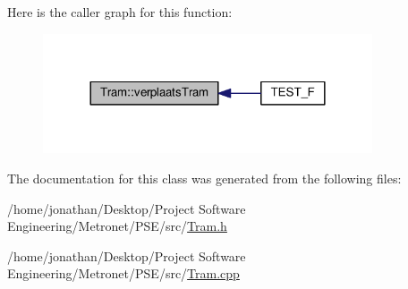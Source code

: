 Here is the caller graph for this function\+:
\nopagebreak
\begin{figure}[H]
\begin{center}
\leavevmode
\includegraphics[width=276pt]{class_tram_a8d55296c7ede4aa92c9b3a4b2a9495a8_icgraph}
\end{center}
\end{figure}




The documentation for this class was generated from the following files\+:\begin{DoxyCompactItemize}
\item 
/home/jonathan/\+Desktop/\+Project Software Engineering/\+Metronet/\+P\+S\+E/src/\hyperlink{_tram_8h}{Tram.\+h}\item 
/home/jonathan/\+Desktop/\+Project Software Engineering/\+Metronet/\+P\+S\+E/src/\hyperlink{_tram_8cpp}{Tram.\+cpp}\end{DoxyCompactItemize}
